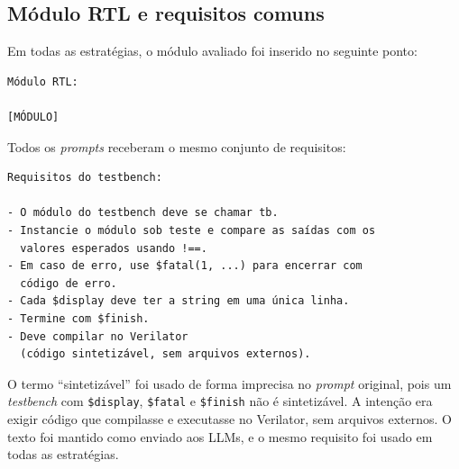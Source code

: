 \subsection{Módulo RTL e requisitos comuns}

Em todas as estratégias, o módulo avaliado foi inserido no seguinte ponto:

\begingroup
\footnotesize
\begin{verbatim}
Módulo RTL:

[MÓDULO]
\end{verbatim}
\endgroup

Todos os \textit{prompts} receberam o mesmo conjunto de requisitos:

\begingroup
\footnotesize
\begin{verbatim}
Requisitos do testbench:

- O módulo do testbench deve se chamar tb.
- Instancie o módulo sob teste e compare as saídas com os
  valores esperados usando !==.
- Em caso de erro, use $fatal(1, ...) para encerrar com
  código de erro.
- Cada $display deve ter a string em uma única linha.
- Termine com $finish.
- Deve compilar no Verilator
  (código sintetizável, sem arquivos externos).
\end{verbatim}
\endgroup

O termo ``sintetizável'' foi usado de forma imprecisa no \textit{prompt} original, pois um \textit{testbench} com \texttt{\$display}, \texttt{\$fatal} e \texttt{\$finish} não é sintetizável. A intenção era exigir código que compilasse e executasse no Verilator, sem arquivos externos. O texto foi mantido como enviado aos LLMs, e o mesmo requisito foi usado em todas as estratégias.
